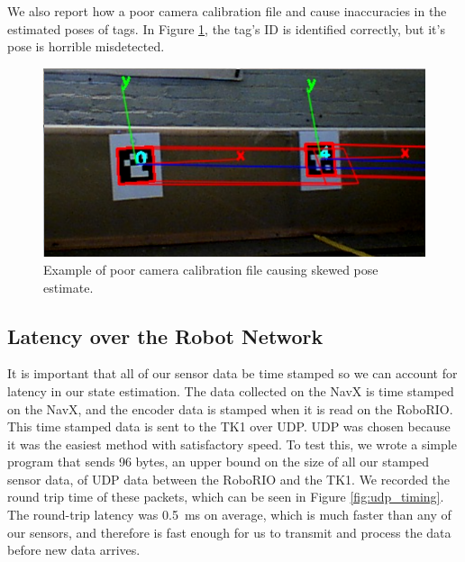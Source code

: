\documentclass{article}
\begin{document}
    We also report how a poor camera calibration file and cause inaccuracies in the estimated poses of tags. In Figure \ref{fig:bad_tag_pose}, the tag's ID is identified correctly, but it's pose is horrible misdetected.

    \begin{figure}[H]
      \centering
      \includegraphics[width=1\linewidth]{./images/bad_tag_pose_1.png}
      \caption{Example of poor camera calibration file causing skewed pose estimate.}
      \label{fig:bad_tag_pose}
    \end{figure}

	\subsection{Latency over the Robot Network}

		It is important that all of our sensor data be time stamped so we can account for latency in our state estimation. The data collected on the NavX is time stamped on the NavX, and the encoder data is stamped when it is read on the RoboRIO. This time stamped data is sent to the TK1 over UDP. UDP was chosen because it was the easiest method with satisfactory speed. To test this, we wrote a simple program that sends 96 bytes, an upper bound on the size of all our stamped sensor data, of UDP data between the RoboRIO and the TK1. We recorded the round trip time of these packets, which can be seen in Figure \ref{fig:udp_timing}. The round-trip latency was \SI{0.5}{\milli\second} on average, which is much faster than any of our sensors, and therefore is fast enough for us to transmit and process the data before new data arrives.
\end{document}
